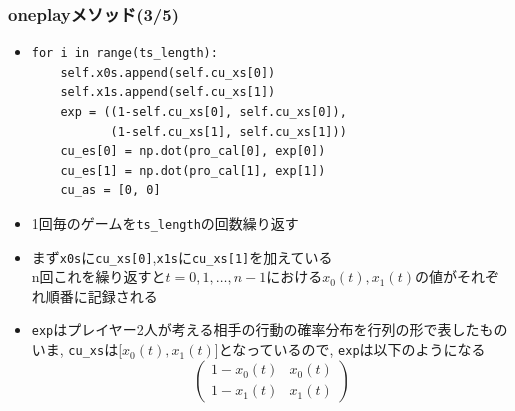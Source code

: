 \documentclass[dvipdfmx,fleqn,handout]{beamer}
\begin{document}
\begin{frame}[fragile]%
\frametitle{oneplayメソッド(3/5)}
\begin{itemize}\setlength{\parskip}{0.5em}
\item
\footnotesize
\begin{verbatim}   
for i in range(ts_length):
    self.x0s.append(self.cu_xs[0])
    self.x1s.append(self.cu_xs[1])
    exp = ((1-self.cu_xs[0], self.cu_xs[0]),
           (1-self.cu_xs[1], self.cu_xs[1]))
    cu_es[0] = np.dot(pro_cal[0], exp[0])
    cu_es[1] = np.dot(pro_cal[1], exp[1])
    cu_as = [0, 0]
\end{verbatim}\pause
\normalsize
\item
1回毎のゲームを\verb|ts_length|の回数繰り返す\pause
\item
まず\verb|x0s|に\verb|cu_xs[0]|,\verb|x1s|に\verb|cu_xs[1]|を加えている\pause
\\n回これを繰り返すと$t=0,1,\dots,n-1$における$x_0(t),x_1(t)$の値がそれぞれ順番に記録される
\item
\verb|exp|はプレイヤー2人が考える相手の行動の確率分布を行列の形で表したもの\pause\\
いま, \verb|cu_xs|は[$x_0(t),x_1(t)$]となっているので, \verb|exp|は以下のようになる\pause
\footnotesize
\begin{equation*}
\begin{pmatrix}
1-x_0(t) & x_0(t)\\
1-x_1(t) & x_1(t)
\end{pmatrix}
\end{equation*}
\normalsize
\end{itemize}
\end{frame}
\end{document}
